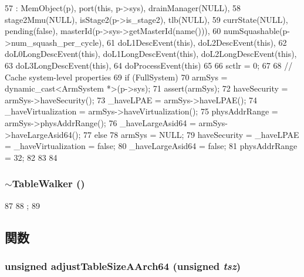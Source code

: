 \begin{DoxyCode}
57     : MemObject(p), port(this, p->sys), drainManager(NULL),
58       stage2Mmu(NULL), isStage2(p->is_stage2), tlb(NULL),
59       currState(NULL), pending(false), masterId(p->sys->getMasterId(name())),
60       numSquashable(p->num_squash_per_cycle),
61       doL1DescEvent(this), doL2DescEvent(this),
62       doL0LongDescEvent(this), doL1LongDescEvent(this), doL2LongDescEvent(this),
63       doL3LongDescEvent(this),
64       doProcessEvent(this)
65 {
66     sctlr = 0;
67 
68     // Cache system-level properties
69     if (FullSystem) {
70         armSys = dynamic_cast<ArmSystem *>(p->sys);
71         assert(armSys);
72         haveSecurity = armSys->haveSecurity();
73         _haveLPAE = armSys->haveLPAE();
74         _haveVirtualization = armSys->haveVirtualization();
75         physAddrRange = armSys->physAddrRange();
76         _haveLargeAsid64 = armSys->haveLargeAsid64();
77     } else {
78         armSys = NULL;
79         haveSecurity = _haveLPAE = _haveVirtualization = false;
80         _haveLargeAsid64 = false;
81         physAddrRange = 32;
82     }
83 
84 }
\end{DoxyCode}
\hypertarget{classArmISA_1_1TableWalker_ab934d192b45cb722aa800d73bbb65f41}{
\subsubsection[{$\sim$TableWalker}]{\setlength{\rightskip}{0pt plus 5cm}$\sim${\bf TableWalker} ()}}
\label{classArmISA_1_1TableWalker_ab934d192b45cb722aa800d73bbb65f41}



\begin{DoxyCode}
87 {
88     ;
89 }
\end{DoxyCode}


\subsection{関数}
\hypertarget{classArmISA_1_1TableWalker_a60f480f39c21ef312d34cb3c8702e9a6}{
\subsubsection[{adjustTableSizeAArch64}]{\setlength{\rightskip}{0pt plus 5cm}unsigned adjustTableSizeAArch64 (unsigned {\em tsz})}}
\label{classArmISA_1_1TableWalker_a60f480f39c21ef312d34cb3c8702e9a6}



